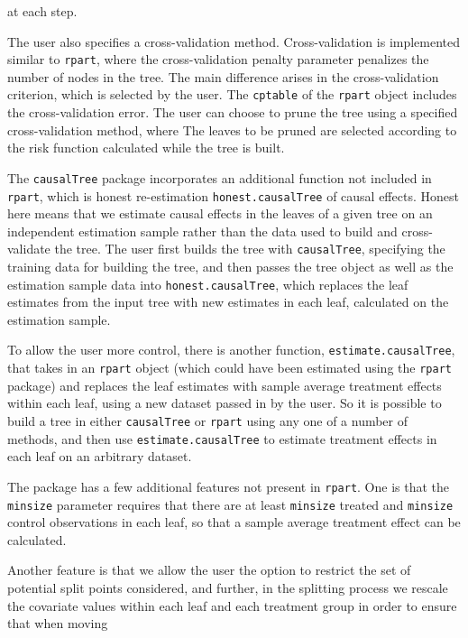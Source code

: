 \documentclass[11pt]{article}
\begin{document}
at each step.\par
The user also specifies a cross-validation method.  Cross-validation is implemented similar to \texttt{rpart}, where the cross-validation penalty parameter
penalizes the number of nodes in the tree.  The main difference arises in the cross-validation criterion, which is
selected by the user.  The \texttt{cptable} of the \texttt{rpart} object includes the cross-validation error.   The user can choose to prune the tree using a specified cross-validation method, where  The leaves to be pruned are selected according to the risk function calculated while
the tree is built. \par
The \texttt{causalTree} package incorporates an additional function not included in \texttt{rpart}, which is honest re-estimation \texttt{honest.causalTree} of causal effects. Honest here means that we estimate causal effects in the leaves of a given tree on an independent estimation sample rather than the data used to build and cross-validate the tree.  The user first builds the tree
with \texttt{causalTree}, specifying the training data for building the tree, and then passes the tree object as well as the estimation sample data
into \texttt{honest.causalTree}, which replaces the leaf estimates from the input tree with new estimates in each leaf, calculated on the estimation sample.\par
To allow the user more control, there is another function, \texttt{estimate.causalTree}, that takes in an \texttt{rpart} object (which could have been estimated using the \texttt{rpart} package) and
replaces the leaf estimates with sample average treatment effects within each leaf, using a new dataset passed in by the user.  So it is possible to build a tree in either \texttt{causalTree}
or \texttt{rpart} using any one of a number of methods, and
then use \texttt{estimate.causalTree} to estimate treatment effects in each leaf on an arbitrary dataset. \par
The package has a few additional features not present in \texttt{rpart}.  One is that the \texttt{minsize} parameter requires that there are at least \texttt{minsize} treated and
\texttt{minsize} control observations in each leaf, so that a sample average treatment effect can be calculated. \par
Another feature is that we allow the user the option to restrict the set of potential split points considered,
and further, in the splitting process we rescale the covariate values within each leaf and each treatment group
in order to ensure that when moving
\end{document}
